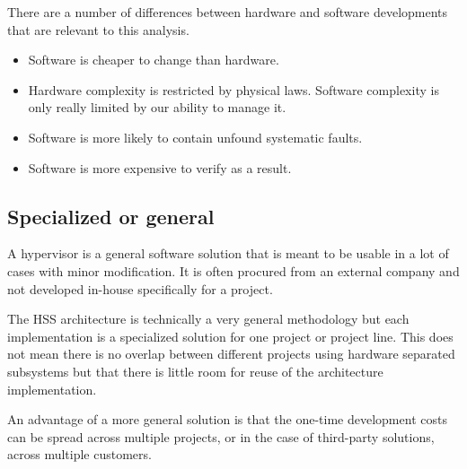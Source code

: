 There are a number of differences between hardware and software developments that are relevant to this analysis.
\begin{itemize}
\item Software is cheaper to change than hardware. 
\item Hardware complexity is restricted by physical laws. Software complexity is only really limited by our ability to manage it.
\item Software is more likely to contain unfound systematic faults.
\item Software is more expensive to verify as a result.
\end{itemize}
\subsection{Specialized or general}
A hypervisor is a general software solution that is meant to be usable in a lot of cases with minor modification. It is often procured from an external company and not developed in-house specifically for a project.

The \gls{HSS} architecture is technically a very general methodology but each implementation is a specialized solution for one project or project line. This does not mean there is no overlap between different projects using hardware separated subsystems but that there is little room for reuse of the architecture implementation.

An advantage of a more general solution is that the one-time development costs can be spread across multiple projects, or in the case of third-party solutions, across multiple customers.   

